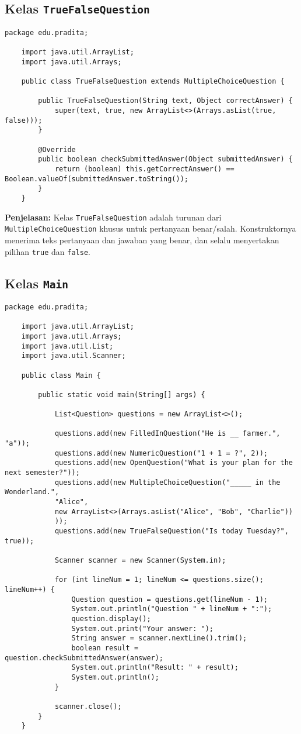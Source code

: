 \subsection{Kelas \texttt{TrueFalseQuestion}}

\begin{lstlisting}[style=JavaStyle]
	package edu.pradita;
	
	import java.util.ArrayList;
	import java.util.Arrays;
	
	public class TrueFalseQuestion extends MultipleChoiceQuestion {
		
		public TrueFalseQuestion(String text, Object correctAnswer) {
			super(text, true, new ArrayList<>(Arrays.asList(true, false)));
		}
		
		@Override
		public boolean checkSubmittedAnswer(Object submittedAnswer) {
			return (boolean) this.getCorrectAnswer() == Boolean.valueOf(submittedAnswer.toString());
		}
	}
\end{lstlisting}

\textbf{Penjelasan:} Kelas \texttt{TrueFalseQuestion} adalah turunan dari \texttt{MultipleChoiceQuestion} khusus untuk pertanyaan benar/salah. Konstruktornya menerima teks pertanyaan dan jawaban yang benar, dan selalu menyertakan pilihan \texttt{true} dan \texttt{false}.

\subsection{Kelas \texttt{Main}}

\begin{lstlisting}[style=JavaStyle]
	package edu.pradita;
	
	import java.util.ArrayList;
	import java.util.Arrays;
	import java.util.List;
	import java.util.Scanner;
	
	public class Main {
		
		public static void main(String[] args) {
			
			List<Question> questions = new ArrayList<>();
			
			questions.add(new FilledInQuestion("He is __ farmer.", "a"));
			questions.add(new NumericQuestion("1 + 1 = ?", 2));
			questions.add(new OpenQuestion("What is your plan for the next semester?"));
			questions.add(new MultipleChoiceQuestion("_____ in the Wonderland.",
			"Alice",
			new ArrayList<>(Arrays.asList("Alice", "Bob", "Charlie"))
			));
			questions.add(new TrueFalseQuestion("Is today Tuesday?", true));
			
			Scanner scanner = new Scanner(System.in);
			
			for (int lineNum = 1; lineNum <= questions.size(); lineNum++) {
				Question question = questions.get(lineNum - 1);
				System.out.println("Question " + lineNum + ":");
				question.display();
				System.out.print("Your answer: ");
				String answer = scanner.nextLine().trim();
				boolean result = question.checkSubmittedAnswer(answer);
				System.out.println("Result: " + result);
				System.out.println();
			}
			
			scanner.close();
		}
	}
\end{lstlisting}

